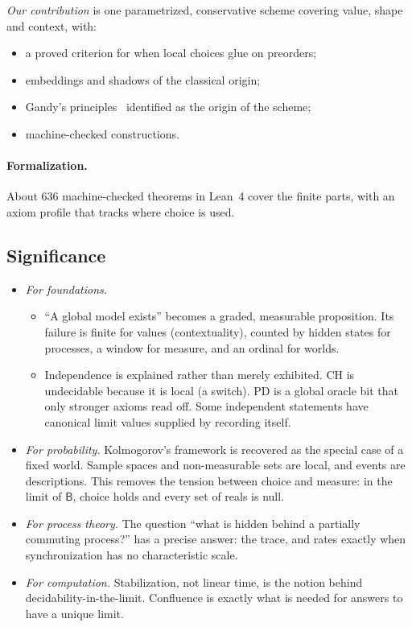 \documentclass[11pt]{article}
\theoremstyle{definition}
\theoremstyle{remark}
\newcommand{\B}{\mathsf{B}}
\begin{document}
\noindent \emph{Our contribution} is one parametrized, conservative scheme covering value, shape and context, with:
\begin{itemize}
\item a proved criterion for when local choices glue on preorders;
\item embeddings and shadows of the classical origin;
\item Gandy's principles~\cite{Gandy80} identified as the origin of the scheme;
\item machine-checked constructions.
\end{itemize}

\paragraph{Formalization.} About 636 machine-checked theorems in Lean~4 cover the finite parts, with an axiom profile that tracks where choice is used.

\subsection{Significance}
\begin{itemize}
\item \emph{For foundations.}
  \begin{itemize}
  \item ``A global model exists'' becomes a graded, measurable proposition. Its failure is finite for values (contextuality), counted by hidden states for processes, a window for measure, and an ordinal for worlds.
  \item Independence is explained rather than merely exhibited. CH is undecidable because it is local (a switch). PD is a global oracle bit that only stronger axioms read off. Some independent statements have canonical limit values supplied by recording itself.
  \end{itemize}
\item \emph{For probability.} Kolmogorov's framework is recovered as the special case of a fixed world. Sample spaces and non-measurable sets are local, and events are descriptions. This removes the tension between choice and measure: in the limit of $\B$, choice holds and every set of reals is null.
\item \emph{For process theory.} The question ``what is hidden behind a partially commuting process?'' has a precise answer: the trace, and rates exactly when synchronization has no characteristic scale.
\item \emph{For computation.} Stabilization, not linear time, is the notion behind decidability-in-the-limit. Confluence is exactly what is needed for answers to have a unique limit.
\end{itemize}
\end{document}

